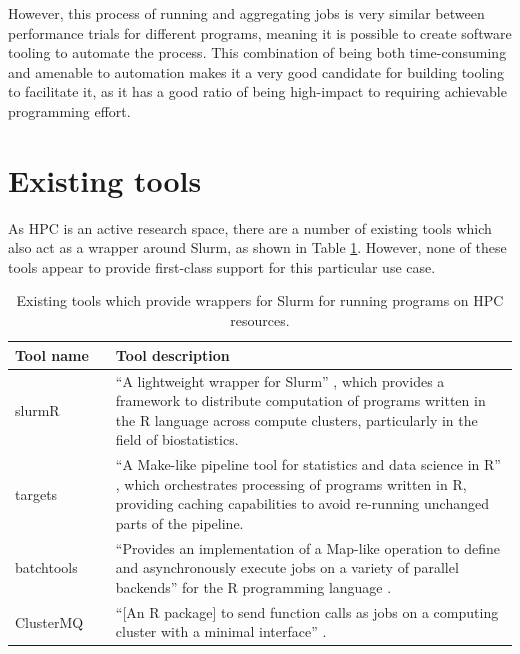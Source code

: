 However, this process of running and aggregating jobs is very similar between performance trials for different programs, meaning it is possible to create software tooling to automate the process. This combination of being both time-consuming and amenable to automation makes it a very good candidate for building tooling to facilitate it, as it has a good ratio of being high-impact to requiring achievable programming effort.

\section{Existing tools}
\label{sec:hpc-multibench-existing-tools}

As \acrshort{HPC} is an active research space, there are a number of existing tools which also act as a wrapper around Slurm, as shown in Table \ref{tab:hpc-multibench-existing-tools}. However, none of these tools appear to provide first-class support for this particular use case.

\begin{table}[H]
    \caption{Existing tools which provide wrappers for Slurm for running programs on \acrshort{HPC} resources.}
    \label{tab:hpc-multibench-existing-tools}
    \begin{tabular}{|p{0.2\linewidth}|p{0.8\linewidth}|}
    \hline
    \textbf{Tool name}  & \textbf{Tool description} \\ \hline\hline
    slurmR \cite{USCbiostatsSlurmR2024} & ``A lightweight wrapper for Slurm'' \cite{gvegayonJournalOpenSource}, which provides a framework to distribute computation of programs written in the R language across compute clusters, particularly in the field of biostatistics. \\ \hline
    targets \cite{RopensciTargets2024} & ``A Make-like pipeline tool for statistics and data science in R'' \cite{landauTargetsPackageDynamic2021}, which orchestrates processing of programs written in R, providing caching capabilities to avoid re-running unchanged parts of the pipeline. \\ \hline
    batchtools \cite{langBatchtoolsToolsWork2017} & ``Provides an implementation of a Map-like operation to define and asynchronously execute jobs on a variety of parallel backends'' for the R programming language \cite{langBatchtoolsToolsWork2017}. \\ \hline
    ClusterMQ \cite{schubertMschubertClustermq2024} & ``[An R package] to send function calls as jobs on a computing cluster with a minimal interface'' \cite{schubertClustermqEnablesEfficient2019}. \\ \hline
    \end{tabular}
\end{table}

